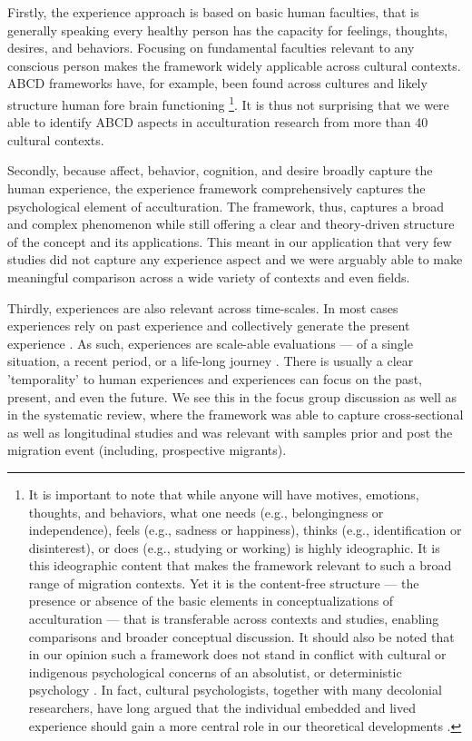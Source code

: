 \documentclass[man, 12pt, a4paper]{apa7}
\begin{document}
Firstly, the experience approach is based on basic human faculties, that is generally speaking every healthy person has the capacity for feelings, thoughts, desires, and behaviors. Focusing on fundamental faculties relevant to any conscious person makes the framework widely applicable across cultural contexts. ABCD frameworks have, for example, been found across cultures \citep[e.g.,][]{Bhawuk2011} and likely structure human fore brain functioning \citep{Swanson2020}\footnote{It is important to note that while anyone will have motives, emotions, thoughts, and behaviors, what one needs (e.g., belongingness or independence), feels (e.g., sadness or happiness), thinks (e.g., identification or disinterest), or does (e.g., studying or working) is highly ideographic. It is this ideographic content that makes the framework relevant to such a broad range of migration contexts. Yet it is the content-free structure --- the presence or absence of the basic elements in conceptualizations of acculturation --- that is transferable across contexts and studies, enabling comparisons and broader conceptual discussion. It should also be noted that in our opinion such a framework does not stand in conflict with cultural or indigenous psychological concerns of an absolutist, or deterministic psychology \citep[e.g.,][]{Kim2006a}. In fact, cultural psychologists, together with many decolonial researchers, have long argued that the individual embedded and lived experience should gain a more central role in our theoretical developments \citep[e.g., ontological turn;][]{Pedersen2020}.}. It is thus not surprising that we were able to identify ABCD aspects in acculturation research from more than 40 cultural contexts.

Secondly, because affect, behavior, cognition, and desire broadly capture the human experience, the experience framework comprehensively captures the psychological element of acculturation. The framework, thus, captures a broad and complex phenomenon while still offering a clear and theory-driven structure of the concept and its applications. This meant in our application that very few studies did not capture any experience aspect and we were arguably able to make meaningful comparison across a wide variety of contexts and even fields.

Thirdly, experiences are also relevant across time-scales. In most cases experiences rely on past experience and collectively generate the present experience \citep[also see][]{Husserl1959, Heidegger1867}. As such, experiences are scale-able evaluations --- of a single situation, a recent period, or a life-long journey \citep[e.g.,][]{Clewett2019}. There is usually a clear 'temporality' to human experiences and experiences can focus on the past, present, and even the future. We see this in the focus group discussion as well as in the systematic review, where the framework was able to capture cross-sectional as well as longitudinal studies and was relevant with samples prior and post the migration event (including, prospective migrants). 
\end{document}
